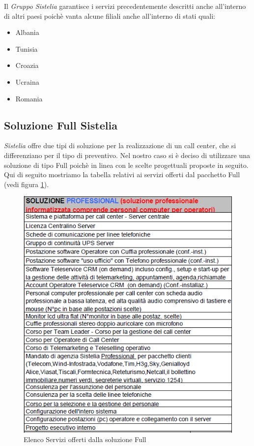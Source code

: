 Il \textit{Gruppo Sistelia} garantisce i servizi precedentemente descritti anche all'interno di altri paesi poichè vanta alcune filiali anche all'interno di stati quali:
\begin{itemize}
\item Albania
\item Tunisia
\item Croazia
\item Ucraina
\item Romania
\end{itemize}

\subsection{Soluzione Full Sistelia}
\textit{Sistelia} offre due tipi di soluzione per la realizzazione di un call center, che si differenziano per il tipo di preventivo.
Nel nostro caso si è deciso di utilizzare una soluzione di tipo Full poichè in linea con le scelte progettuali proposte in seguito. Qui di seguito mostriamo la tabella relativi ai servizi offerti dal pacchetto Full (vedi figura \ref{fig:full}).
\begin{figure}[htbp]
\centering
\includegraphics[scale=0.85]{immagini/Full.png}
\caption{Elenco Servizi offerti dalla soluzione Full \label{fig:full}}
\end{figure}
